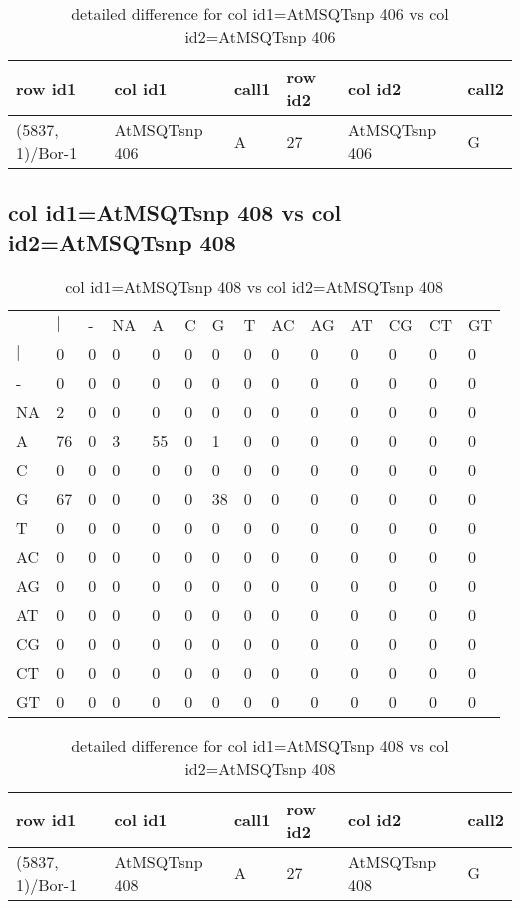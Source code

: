 \begin{center}
\begin{longtable}{|l|l|l|l|l|l|}
\caption{detailed difference for col id1=AtMSQTsnp 406 vs col id2=AtMSQTsnp 406} \label{table_dm721}\\
\hline
row id1&col id1&call1&row id2&col id2&call2\\
\hline
(5837, 1)/Bor-1&AtMSQTsnp 406&A&27&AtMSQTsnp 406&G\\
\hline
\end{longtable}
\end{center}

\subsection{col id1=AtMSQTsnp 408 vs col id2=AtMSQTsnp 408}
\begin{center}
\begin{longtable}{|l|l|l|l|l|l|l|l|l|l|l|l|l|l|}
\caption{col id1=AtMSQTsnp 408 vs col id2=AtMSQTsnp 408} \label{table_dm722}\\
\hline
\\
\hline
&$|$&-&NA&A&C&G&T&AC&AG&AT&CG&CT&GT\\
$|$&0&0&0&0&0&0&0&0&0&0&0&0&0\\
-&0&0&0&0&0&0&0&0&0&0&0&0&0\\
NA&2&0&0&0&0&0&0&0&0&0&0&0&0\\
A&76&0&3&55&0&1&0&0&0&0&0&0&0\\
C&0&0&0&0&0&0&0&0&0&0&0&0&0\\
G&67&0&0&0&0&38&0&0&0&0&0&0&0\\
T&0&0&0&0&0&0&0&0&0&0&0&0&0\\
AC&0&0&0&0&0&0&0&0&0&0&0&0&0\\
AG&0&0&0&0&0&0&0&0&0&0&0&0&0\\
AT&0&0&0&0&0&0&0&0&0&0&0&0&0\\
CG&0&0&0&0&0&0&0&0&0&0&0&0&0\\
CT&0&0&0&0&0&0&0&0&0&0&0&0&0\\
GT&0&0&0&0&0&0&0&0&0&0&0&0&0\\
\hline
\end{longtable}
\end{center}

\begin{center}
\begin{longtable}{|l|l|l|l|l|l|}
\caption{detailed difference for col id1=AtMSQTsnp 408 vs col id2=AtMSQTsnp 408} \label{table_dm723}\\
\hline
row id1&col id1&call1&row id2&col id2&call2\\
\hline
(5837, 1)/Bor-1&AtMSQTsnp 408&A&27&AtMSQTsnp 408&G\\
\hline
\end{longtable}
\end{center}


